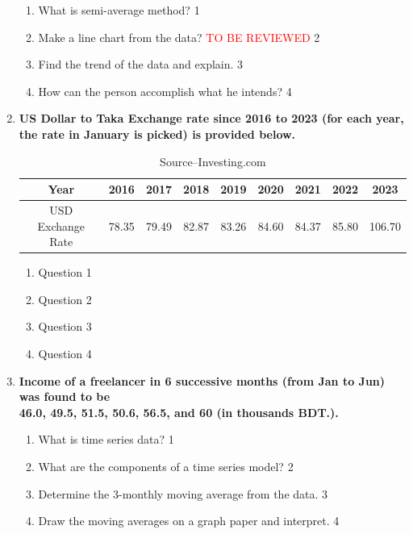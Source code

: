 \documentclass[a4paper,oneside]{book}
\begin{document}
\begin{enumerate}
  \begin{enumerate}
    \item
	What is semi-average method? \hfill 1
    \item
	Make a line chart from the data? \textcolor{red}{TO BE REVIEWED} \hfill 2
    \item  
	Find the trend of the data and explain. \hfill 3
    \item
	How can the person accomplish what he intends? \hfill 4
  \end{enumerate}
  
   \item
	  \textbf{US Dollar to Taka Exchange rate since 2016 to 2023 (for each year, the rate in January is picked) is provided below. } 
  
  \begin{table}[h]
  \centering
\begin{tabular}{c|cccccccc}
Year & 2016 & 2017 & 2018 & 2019 & 2020 & 2021 & 2022 & 2023 \\ \hline
USD Exchange Rate & 78.35 & 79.49 & 82.87 & 83.26 & 84.60 & 84.37 & 85.80 & 106.70
\end{tabular}
\caption{\label{usdrate}Source--Investing.com}
\end{table}
  
  \begin{enumerate}
    \item
	Question \hfill 1
    \item
	Question \hfill 2
    \item  
	Question \hfill 3
    \item
	Question \hfill 4
  \end{enumerate}

 \item
	  \textbf{Income of a freelancer in 6 successive months (from Jan to Jun) was found to be \\ 46.0, 49.5, 51.5, 50.6, 56.5, and 60 (in thousands BDT.).}
  \begin{enumerate}
    \item
	What is time series data? \hfill 1
    \item
	What are the components of a time series model? \hfill 2
    \item  
	Determine the 3-monthly moving average from the data. \hfill 3
    \item
	Draw the moving averages on a graph paper and interpret. \hfill 4
\end{enumerate}


\end{enumerate}
\end{document}
